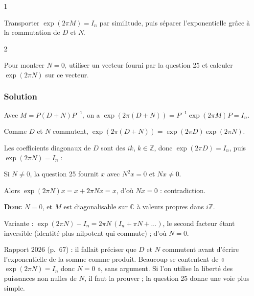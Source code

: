 \documentclass[11pt,a4paper]{article}
\newcommand{\equationajustee}[1]{%
  \sbox{\boiteequation}{$\displaystyle #1$}%
  \ifdim\wd\boiteequation>\linewidth
    \[\resizebox{\linewidth}{!}{\usebox{\boiteequation}}\]%
  \else
    \[#1\]%
  \fi}
\begin{document}
\begin{indication}{1}

Transporter \(\exp(2\pi M)=I_n\) par similitude, puis séparer l'exponentielle grâce à la commutation de \(D\) et \(N\).

\end{indication}

\begin{indication}{2}

Pour montrer \(N=0\), utiliser un vecteur fourni par la question 25 et calculer \(\exp(2\pi N)\) sur ce vecteur.

\end{indication}

\hypertarget{solution-27}{%
\subsubsection{Solution}\label{solution-27}}

Avec \(M=P(D+N)P^{-1}\), on a \(\exp(2\pi(D+N))=P^{-1}\exp(2\pi M)P=I_n\).

Comme \(D\) et \(N\) commutent, \(\exp(2\pi(D+N))=\exp(2\pi D)\exp(2\pi N)\).

Les coefficients diagonaux de \(D\) sont des \(ik\), \(k\in\mathbb{Z}\), donc \(\exp(2\pi D)=I_n\), puis \(\exp(2\pi N)=I_n\) :

\equationajustee{\boxed{\exp(2\pi D)=I_n\ \text{ et }\ \exp(2\pi N)=I_n.}}

Si \(N\neq0\), la question 25 fournit \(x\) avec \(N^2x=0\) et \(Nx\neq0\).

Alors \(\exp(2\pi N)x=x+2\pi Nx=x\), d'où \(Nx=0\) : contradiction.

\textbf{Donc \(N=0\)}, et \(M\) est diagonalisable sur \(\mathbb{C}\) à valeurs propres dans \(i\mathbb{Z}\).

\begin{methode}

Variante : \(\exp(2\pi N)-I_n=2\pi N\,(I_n+\pi N+\dots)\), le second facteur étant inversible (identité plus nilpotent qui commute) ; d'où \(N=0\).

\end{methode}

\begin{jury}

Rapport 2026 (p.~67) : il fallait préciser que \(D\) et \(N\) commutent avant d'écrire l'exponentielle de la somme comme produit. Beaucoup se contentent de « \(\exp(2\pi N)=I_n\) donc \(N=0\) », sans argument. Si l'on utilise la liberté des puissances non nulles de \(N\), il faut la prouver ; la question 25 donne une voie plus simple.

\end{jury}
\end{document}
